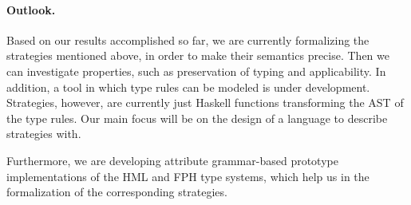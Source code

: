 \documentclass[a4paper]{article}
\begin{document}
\paragraph{Outlook.}
Based on our results accomplished so far, we are currently formalizing
the strategies mentioned above, in order to make their semantics precise. Then
we can investigate properties, such as preservation of typing and
applicability. In addition, a tool in which type rules can be
modeled is under development. Strategies, however, are currently just
Haskell functions transforming the AST of the type rules. Our main
focus will be on the design of a language to describe strategies with. 

Furthermore, we are developing attribute grammar-based prototype
implementations of the HML and FPH type systems, which help us in the
formalization of the corresponding strategies.

\nocite{ariemtfp08, hage07generic, dolstra08report}



\end{document}
